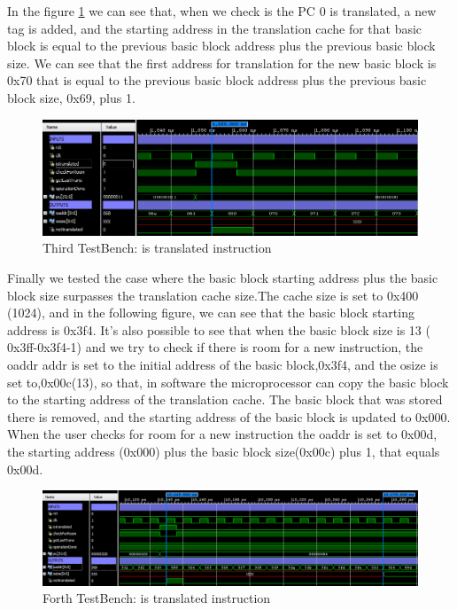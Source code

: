 In the figure \ref{fig:TestBench2} we can see that, when we check is the PC 0 is translated, a new tag is added, and the starting address in the translation cache for that basic block is equal to the previous basic block address plus the previous basic block size. We can see that the first address for translation for the new basic block is 0x70 that is equal to the previous basic block address plus the previous basic block size, 0x69, plus 1.

\begin{figure} [H]
	\centering
	\includegraphics[scale = 0.5]{Images/TestBench2.png}
	\caption{Third TestBench: is translated instruction}
	\label{fig:TestBench2}
\end{figure}

Finally we tested the case where the basic block starting address plus the basic block size surpasses the translation cache size.The cache size is set to 0x400 (1024), and in the following figure, we can see that the basic block starting address is 0x3f4. It's also possible to see that when the basic block size is 13 ( 0x3ff-0x3f4-1) and we try to check if there is room for a new instruction, the oaddr addr is set to the initial address of the basic block,0x3f4, and the osize is set to,0x00c(13), so that, in software the microprocessor can copy the basic block to the starting address of the translation cache. The basic block that was stored there is removed, and the starting address of the basic block is updated to 0x000. When the user checks for room for a new instruction the oaddr is set to 0x00d, the starting address (0x000) plus the basic block size(0x00c) plus 1, that equals 0x00d.

\begin{figure} [H]
	\centering
	\includegraphics[scale = 0.5]{Images/TestBench3.png}
	\caption{Forth TestBench: is translated instruction}
	\label{fig:TestBench3}
\end{figure}